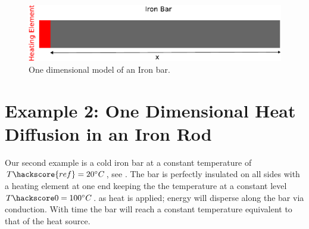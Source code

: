 
%
%
%
\begin{figure}[ht]
\centerline{\includegraphics[width=4.in]{figures/onedheatdiff002}}
\caption{One dimensional model of an Iron bar.}
\label{fig:onedhdmodel}
\end{figure}

\section{Example 2: One Dimensional Heat Diffusion in an Iron Rod}
\label{Sec:1DHDv0}

Our second example is a cold iron bar at a constant temperature of $T\hackscore{ref}=20^{\circ} C$, see . The bar is perfectly insulated on all sides with a heating element at one end keeping the the temperature at a constant level $T\hackscore0=100^{\circ} C$.  as heat is applied; energy will disperse along the bar via conduction. With time the bar will reach a constant temperature equivalent to that of the heat source.

